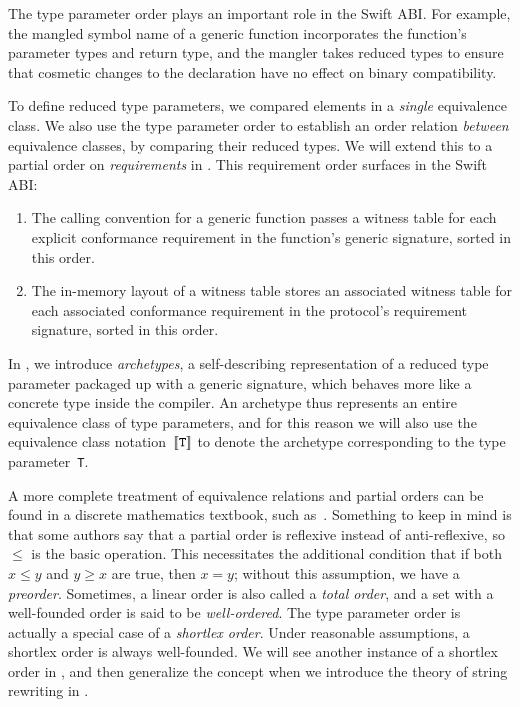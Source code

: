 \documentclass[../generics]{subfiles}
\begin{document}
The type parameter order plays an important role in the Swift ABI. For example, the mangled symbol name of a generic function incorporates the function's parameter types and return type, and the mangler takes reduced types to ensure that cosmetic changes to the declaration have no effect on binary compatibility.

To define reduced type parameters, we compared elements in a \emph{single} equivalence class. We also use the type parameter order to establish an order relation \emph{between} equivalence classes, by comparing their reduced types. We will extend this to a partial order on \emph{requirements} in . This requirement order surfaces in the Swift ABI:
\begin{enumerate}
\item The calling convention for a generic function passes a witness table for each explicit conformance requirement in the function's generic signature, sorted in this order.
\item The in-memory layout of a witness table stores an associated witness table for each associated conformance requirement in the protocol's requirement signature, sorted in this order.
\end{enumerate}

In , we introduce \emph{archetypes}, a self-describing representation of a reduced type parameter packaged up with a generic signature, which behaves more like a concrete type inside the compiler. An archetype thus represents an entire equivalence class of type parameters, and for this reason we will also use the equivalence class notation~$[\![\texttt{T}]\!]$ to denote the archetype corresponding to the type parameter~\texttt{T}.

A more complete treatment of equivalence relations and partial orders can be found in a discrete mathematics textbook, such as~\cite{grimaldi}. Something to keep in mind is that some authors say that a partial order is reflexive instead of anti-reflexive, so $\leq$ is the basic operation. This necessitates the additional condition that if both $x\leq y$ and $y\geq x$ are true, then $x=y$; without this assumption, we have a \emph{preorder}. Sometimes, a linear order is also called a \emph{total order}, and a set with a well-founded order is said to be \emph{well-ordered}. The type parameter order is actually a special case of a \emph{shortlex order}. Under reasonable assumptions, a shortlex order is always well-founded. We will see another instance of a shortlex order in , and then generalize the concept when we introduce the theory of string rewriting in .
\end{document}
